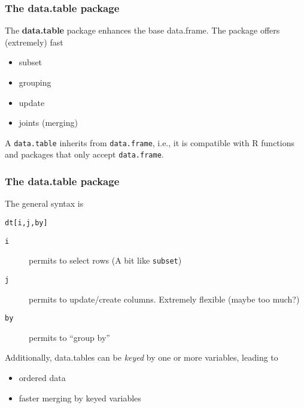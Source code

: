 \documentclass[paper=screen,mathserif]{beamer}\usepackage[]{graphicx}\usepackage[]{color}
\makeatletter
\newcommand{\hlstd}[1]{\textcolor[rgb]{0.345,0.345,0.345}{#1}}%
\newenvironment{kframe}{%
 \def\at@end@of@kframe{}%
 \ifinner\ifhmode%
  \def\at@end@of@kframe{\end{minipage}}%
  \begin{minipage}{\columnwidth}%
 \fi\fi%
 \def\FrameCommand##1{\hskip\@totalleftmargin \hskip-\fboxsep
 \colorbox{shadecolor}{##1}\hskip-\fboxsep
     \hskip-\linewidth \hskip-\@totalleftmargin \hskip\columnwidth}%
 \MakeFramed {\advance\hsize-\width
   \@totalleftmargin\z@ \linewidth\hsize
   \@setminipage}}%
 {\par\unskip\endMakeFramed%
 \at@end@of@kframe}
\newenvironment{knitrout}{}{} %
\newcommand{\ft}[1]{\frametitle{#1}}
\makeatother
\begin{document}
\begin{frame}[fragile]
  \ft{The {\bf data.table} package}
  
  The {\bf data.table} package enhances the base data.frame. The
  package offers (extremely) fast
  
  \begin{itemize}
  \item subset
  \item grouping
  \item update
  \item joints (merging)
  \end{itemize}
  
  A {\tt data.table} inherits from {\tt data.frame}, i.e., it is
  compatible with R functions and packages that only accept
  {\tt data.frame}.
  
\end{frame}

\begin{frame}[fragile]
  \ft{The {\bf data.table} package}
  
  The general syntax is
\begin{knitrout}\scriptsize
{}\color{fgcolor}\begin{kframe}
\begin{alltt}
\hlstd{dt[i, j, by]}
\end{alltt}
\end{kframe}
\end{knitrout}
  \begin{description}
  \item[{\tt i}] permits to select rows (A bit like {\tt subset})
  \item[{\tt j}] permits to update/create columns. Extremely flexible
    {\color{gray}(maybe too much?)}
   \item[{\tt by}] permits to ``group by''
  \end{description}
Additionally, data.tables can be {\em keyed} by one or more variables,
leading to
\begin{itemize}
\item ordered data
\item faster merging by keyed variables
\end{itemize}

\end{frame}
\end{document}
